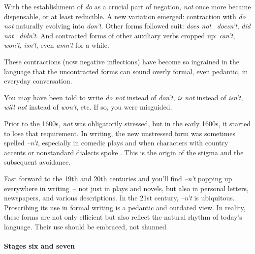 With the establishment of \textit{do} as a crucial part of negation, \textit{not} once more became dispensable, or at least reducible. A new variation emerged: contraction with \textit{do not} naturally evolving into \textit{don't}. Other forms followed suit: \textit{does not} \rightarrow ~\textit{doesn't}, \textit{did not} \rightarrow ~\textit{didn't}. And contracted forms of other auxiliary verbs cropped up: \textit{can't}, \textit{won't}, \textit{isn't}, even \textit{amn't} for a while.

These contractions (now negative inflections) have become so ingrained in the language that the uncontracted forms can sound overly formal, even pedantic, in everyday conversation.

\begin{tcolorbox}[title=Negative auxiliary verbs, colback=white]

You may have been told to write \textit{do not} instead of \textit{don't}, \textit{is not} instead of \textit{isn't}, \textit{will not} instead of \textit{won't}, etc. If so, you were misguided. 

\phantom{fri}Prior to the 1600s, \textit{not} was obligatorily stressed, but in the early 1600s, it started to lose that requirement. In writing, the new unstressed form was sometimes spelled \textit{--n't}, especially in comedic plays and when characters with country accents or nonstandard dialects spoke \citep{Brainerd1989}. This is the origin of the stigma and the subsequent avoidance.

\phantom{fri}Fast forward to the 19th and 20th centuries and you'll find \textit{--n't} popping up everywhere in writing~-- not just in plays and novels, but also in personal letters, newspapers, and various descriptions. In the 21st century, \textit{--n't} is ubiquitous. Proscribing its use in formal writing is a pedantic and outdated view. In reality, these forms are not only efficient but also reflect the natural rhythm of today's language. Their use should be embraced, not shunned

\end{tcolorbox}

\paragraph{Stages six and seven}

